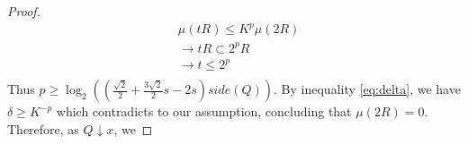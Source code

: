 \documentclass{article}
\begin{document}
\begin{proof}
\begin{equation*}
    \begin{aligned}
    & \mu(tR) \leq K^p\mu(2R) \\
    & \rightarrow tR \subset 2^{p}R \\
    & \rightarrow t \leq  2^{p} \\
    \end{aligned}
\end{equation*}
Thus $p \geq \log_2((\frac{\sqrt{2}}{2} + \frac{3\sqrt{2}}{2}s - 2s)side(Q))$. By inequality \ref{eq:delta}, we have $\delta\geq K^{-p}$ which contradicts to our assumption, concluding that $\mu(2R) = 0$. Therefore, as $Q \downarrow x$, we 
\end{proof}
\end{document}
